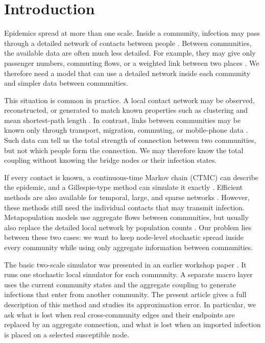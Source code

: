 \begingroup\color{red}
\hypersetup{citecolor=red,linkcolor=red}

\section{Introduction}
\label{sec:introduction}

Epidemics spread at more than one scale. Inside a community, infection may pass through a detailed network of contacts between people \citep{keeling2005,pastorsatorras2015,kiss2017}. Between communities, the available data are often much less detailed. For example, they may give only passenger numbers, commuting flows, or a weighted link between two places \citep{balcan2009,barbosa2018human}. We therefore need a model that can use a detailed network inside each community and simpler data between communities.

This situation is common in practice. A local contact network may be observed, reconstructed, or generated to match known properties such as clustering and mean shortest-path length \citep{eubank2004,danon2011}. In contrast, links between communities may be known only through transport, migration, commuting, or mobile-phone data \citep{barbosa2018human,chang2021}. Such data can tell us the total strength of connection between two communities, but not which people form the connection. We may therefore know the total coupling without knowing the bridge nodes or their infection states.

If every contact is known, a continuous-time Markov chain (CTMC) can describe the epidemic, and a Gillespie-type method can simulate it exactly \citep{gillespie1977exact,gibson2000}. Efficient methods are also available for temporal, large, and sparse networks \citep{vestergaard2015,kuryliak2025simulating}. However, these methods still need the individual contacts that may transmit infection. Metapopulation models use aggregate flows between communities, but usually also replace the detailed local network by population counts \citep{colizza2007reaction,colizza2008,balcan2010modeling,ajelli2010}. Our problem lies between these two cases: we want to keep node-level stochastic spread inside every community while using only aggregate information between communities.

The basic two-scale simulator was presented in an earlier workshop paper \citep{kuryliak2025towards}. It runs one stochastic local simulator for each community. A separate macro layer uses the current community states and the aggregate coupling to generate infections that enter from another community. The present article gives a full description of this method and studies its approximation error. In particular, we ask what is lost when real cross-community edges and their endpoints are replaced by an aggregate connection, and what is lost when an imported infection is placed on a selected susceptible node.

